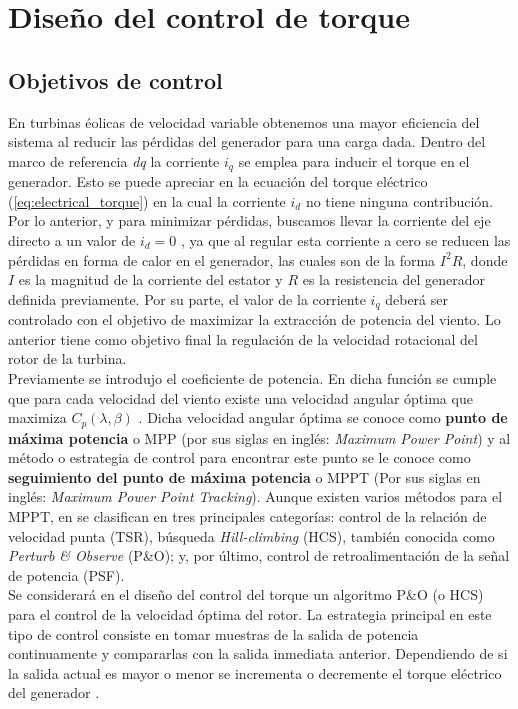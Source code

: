 \section{Diseño del control de torque}

\subsection{Objetivos de control}
\label{sec:objetivos_de_control}

En turbinas éolicas de velocidad variable obtenemos una mayor eficiencia del sistema al reducir las pérdidas
del generador para una carga dada. Dentro del marco de referencia \emph{dq} la corriente $i_q$ se emplea para
inducir el torque en el generador. Esto se puede apreciar en la ecuación del torque eléctrico (\ref{eq:electrical_torque})
en la cual la corriente $i_d$ no tiene ninguna contribución. Por lo anterior, y para minimizar pérdidas, 
buscamos llevar la corriente del eje directo a un valor de $i_d = 0$ \cite{chinchilla2006}, ya que al regular esta 
corriente a cero se reducen las pérdidas en forma de calor en el generador, las cuales son de la forma $I^2R$, 
donde $I$ es la magnitud de la corriente del estator y $R$ es la resistencia del generador definida previamente.
Por su parte, el valor de la corriente $i_q$ deberá ser controlado con el objetivo de maximizar la extracción 
de potencia del viento. Lo anterior tiene como objetivo final la regulación de la velocidad rotacional del 
rotor de la turbina. 
\\

Previamente se introdujo el coeficiente de potencia. En dicha función se cumple que
para cada velocidad del viento existe una velocidad angular óptima que maximiza $C_p(\lambda,\beta)$ \cite{Leidhold2002,nak2013}.
Dicha velocidad angular óptima se conoce como \textbf{punto de máxima potencia} o MPP (por sus siglas en inglés: 
\emph{Maximum Power Point}) y al método o estrategia de control para encontrar este punto se le conoce como
\textbf{seguimiento del punto de máxima potencia} o MPPT (Por sus siglas en inglés: \emph{Maximum
Power Point Tracking}). Aunque existen varios métodos para el MPPT, en \cite{nak2013} se 
clasifican en tres principales categorías: control de la relación de velocidad punta (TSR), búsqueda 
\emph{Hill-climbing} (HCS), también conocida como \emph{Perturb \& Observe} (P\&O); y, por último, control de 
retroalimentación de la señal de potencia (PSF).
\\

Se considerará en el diseño del control del torque un algoritmo P\&O (o HCS) para el control de la velocidad óptima del
rotor. La estrategia principal en este tipo de control consiste en tomar muestras de la salida de potencia 
continuamente y compararlas con la salida inmediata anterior. Dependiendo de si la salida actual es mayor o menor
se incrementa o decremente el torque eléctrico del generador \cite{wang2004,buehring1981}.
\\

